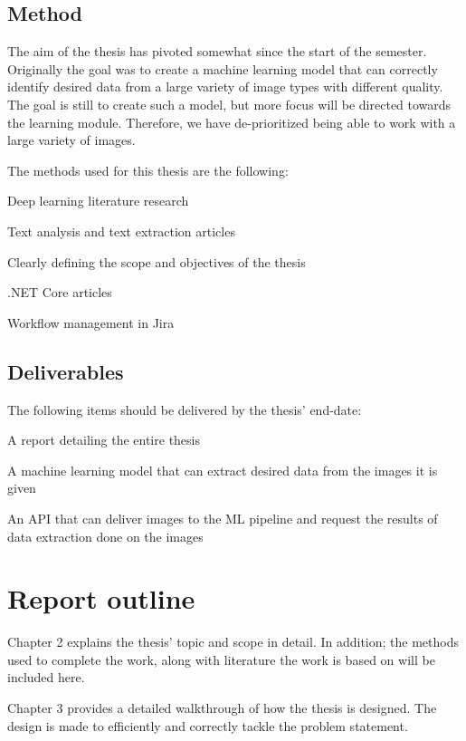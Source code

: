 \subsection{Method}\label{subsec:method}
The aim of the thesis has pivoted somewhat since the start of the semester.
Originally the goal was to create a machine learning model that can correctly identify desired data from a large variety of image types with different quality.
The goal is still to create such a model, but more focus will be directed towards the learning module.
Therefore, we have de-prioritized being able to work with a large variety of images.

The methods used for this thesis are the following:
\begin{compactitem}
    \item Deep learning literature research
    \item Text analysis and text extraction articles
    \item Clearly defining the scope and objectives of the thesis
    \item .NET Core articles
    \item Workflow management in Jira
\end{compactitem}

\subsection{Deliverables}\label{subsec:deliverables}
The following items should be delivered by the thesis' end-date:
\begin{compactitem}
    \item A report detailing the entire thesis
    \item A machine learning model that can extract desired data from the images it is given
    \item An API that can deliver images to the ML pipeline and request the results of data extraction done on the images
\end{compactitem}

\section{Report outline}\label{sec:report-outline}
Chapter 2 explains the thesis' topic and scope in detail.
In addition;
the methods used to complete the work, along with literature the work is based on will be included here.

Chapter 3 provides a detailed walkthrough of how the thesis is designed.
The design is made to efficiently and correctly tackle the problem statement.

